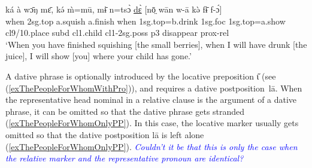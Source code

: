 \documentclass[10pt,twoside]{article}
\def\ci#1{{\ipaFont #1}}
\newcommand{\gl}[1]{`#1'}
\def\VSP{\vspace{0pt}}
\newcommand{\cl}[1]{{\sc cl#1}}
\newcommand{\pref}[1]{(\ref{#1})}
\def\ih{ɩ}
\newcommand{\comment}[1]{\textcolor{blue}{\emph{#1}}}
\begin{document}
\begin{exe}
	\ex \label{exWhenYouHaveFinishedSquishing} 		
		\gll ká à wɔ̄ŋ mɛ̄, kə́ m̀=mū, mɨ̄ n=tsɔ̀ \uline{dɛ̀} [nō̤ wān w-ā kə̀ fɨ̄ f-ɔ́]	\\
		when	{\sc 2sg.top}	a.squish	a.finish		when	{\sc 1sg.top}=b.drink	{\sc 1sg.foc}	{\sc 1sg.top}=a.show	\cl9/10.place	{\sc subd}			\cl1.child		\cl1-{\sc 2sg.poss}	{\sc p3}	disappear	{\sc prox}-{\sc rel}	\\
		\glt \VSP \gl{When you have finished squishing [the small berries], when I will have drunk [the juice], I will show [you] where your child has gone.}
\end{exe}%

A dative phrase is optionally introduced by the locative preposition \ci{\H\ih} (see \pref{exThePeopleForWhomWithPro}),
and requires a dative postposition~\ci{l\=a}. 
When the representative head nominal in a relative clause is the argument of a dative phrase, it 
can be omitted so that the dative phrase gets stranded \pref{exThePeopleForWhomOnlyPP}. In this 
case, the locative marker \ci{{\H\ih}} usually gets omitted so that the dative postposition \ci{lā} 
is left alone \pref{exThePeopleForWhomOnlyPP}.
\comment{Couldn't it be that this is only the case when the relative marker and the representative pronoun are identical?}
\end{document}
